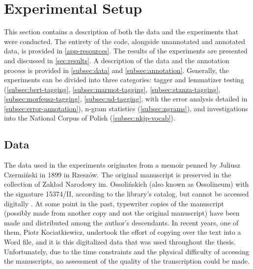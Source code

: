 \section{Experimental Setup}
\label{sec:exp-setup}

This section contains a description of both the data and the experiments that were conducted. The entirety of the code, alongside unannotated and annotated data, is provided in \autoref{app-resources}. The results of the experiments are presented and discussed in \autoref{sec:results}. A description of the data and the annotation process is provided in \autoref{subsec:data} and \autoref{subsec:annotation}. Generally, the experiments can be divided into three categories: tagger and lemmatizer testing (\autoref{subsec:bert-tagging}, \autoref{subsec:marmot-tagging}, \autoref{subsec:stanza-tagging}, \autoref{subsec:morfeusz-tagging}, \autoref{subsec:ud-tagging}, with the error analysis detailed in \autoref{subsec:error-annotation}), n-gram statistics (\autoref{subsec:ngrams}), and investigations into the National Corpus of Polish (\autoref{subsec:nkjp-vocab}). 

\subsection{Data}
\label{subsec:data}

The data used in the experiments originates from a memoir penned by Juliusz Czermiński in 1899 in Rzeszów. The original manuscript is preserved in the collection of Zakład Narodowy im. Ossolińskich (also known as Ossolineum) with the signature 15374/II, according to the library's catalog, but cannot be accessed digitally \citep{ossolineum}. At some point in the past, typewriter copies of the manuscript (possibly made from another copy and not the original manuscript) have been made and distributed among the author's descendants. In recent years, one of them, Piotr Kociat\-kiewicz, undertook the effort of copying over the text into a Word file, and it is this digitalized data that was used throughout the thesis. Unfortunately, due to the time constraints and the physical difficulty of accessing the manuscripts, no assessment of the quality of the transcription could be made.

